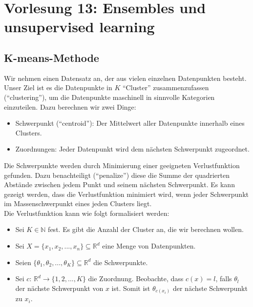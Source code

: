 \section{Vorlesung 13: Ensembles und unsupervised learning}
\label{sec:vl13}

\subsection{K-means-Methode}
\label{subsec:vl13}

Wir nehmen einen Datensatz an, der aus vielen einzelnen Datenpunkten besteht. Unser Ziel ist es die Datenpunkte in $K$ ``Cluster'' zusammenzufassen (``clustering''), um die Datenpunkte maschinell in sinnvolle Kategorien einzuteilen. Dazu berechnen wir zwei Dinge:

\begin{itemize}
    \setlength\itemsep{0em}
        \item Schwerpunkt (``centroid''): Der Mittelwert aller Datenpunkte innerhalb eines Clusters.
        \item Zuordnungen: Jeder Datenpunkt wird dem n\"achsten Schwerpunkt zugeordnet.
\end{itemize}

Die Schwerpunkte werden durch Minimierung einer geeigneten Verlustfunktion gefunden. Dazu benachteiligt (``penalize'') diese die Summe der quadrierten Abstände zwischen jedem Punkt und seinem nächsten Schwerpunkt. Es kann gezeigt werden, dass die Verlustfunktion minimiert wird, wenn jeder Schwerpunkt im Massenschwerpunkt eines jeden Clusters liegt.\\[0.3cm]
Die Verlustfunktion kann wie folgt formalisiert werden:
\begin{itemize}
    \setlength\itemsep{0em}
        \item Sei $K \in \mathbb{N}$ fest. Es gibt die Anzahl der Cluster an, die wir berechnen wollen.
        \item Sei $X = \{ x_1, x_2, ..., x_n\} \subseteq \mathbb{R}^d$ eine Menge von Datenpunkten.
        \item Seien $\{\theta_1, \theta_2, ..., \theta_K\} \subseteq \mathbb{R}^d$ die Schwerpunkte.
        \item Sei $c$: $\mathbb{R}^d \rightarrow \{1, 2, ..., K\} $ die Zuordnung. Beobachte, dass $c(x) = l$, falls $\theta_l$ der n\"achste Schwerpunkt von $x$ ist. Somit ist $\theta_{c(x_i)}$ der n\"achste Schwerpunkt zu $x_i$.
\end{itemize}

